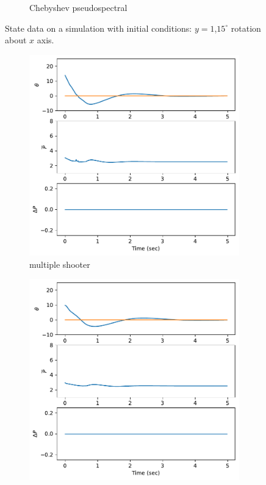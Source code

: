 \documentclass[]{article}
\begin{document}
\begin{figure}[H]
\begin{subfigure}[b]{0.3\textwidth}
		\caption{Chebyshev pseudospectral}
	\end{subfigure}
	\caption{State data on a simulation with initial conditions: $y = 1$,$15^{\circ}$ rotation about $x$ axis.}
	\label{fig:statey115dx}
\end{figure}

\begin{figure}[H]
	\centering
	\begin{subfigure}[b]{0.3\textwidth}
	\centering
	\includegraphics[width=\textwidth]{figures/controly115dx6.pdf}
	\caption{multiple shooter}
\end{subfigure}
	\begin{subfigure}[b]{0.3\textwidth}
		\centering
		\includegraphics[width=\textwidth]{figures/controly115dx4.pdf}

\end{subfigure}
\end{figure}
\end{document}
